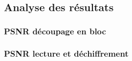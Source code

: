     \subsection{Analyse des résultats}

        \begin{frame}
            \frametitle{PSNR découpage en bloc}
        \end{frame}

        \begin{frame}
            \frametitle{PSNR lecture et déchiffrement}
        \end{frame}
